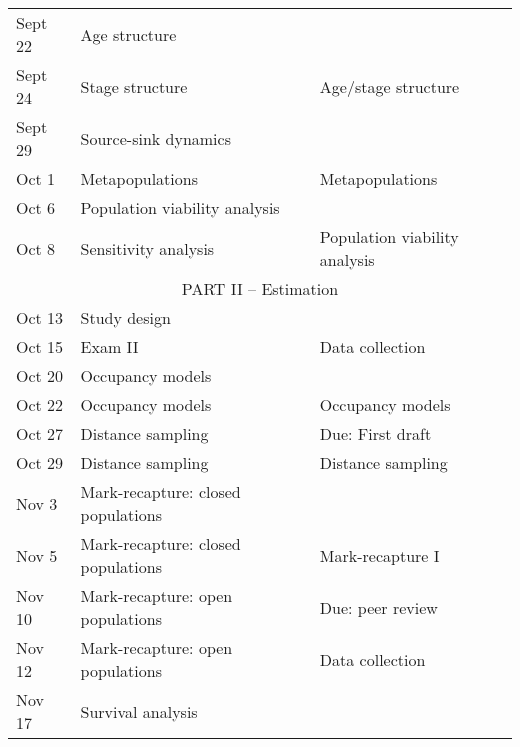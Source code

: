 \documentclass[12pt]{article}
\begin{document}
\begin{center}
\begin{tabular}[c]{lll}
\hline
Sept 22    & Age structure                      &                                      \\
Sept 24    & Stage structure                    & Age/stage structure                  \\
\hline
Sept 29      & Source-sink dynamics               &                                      \\
Oct 1      & Metapopulations                    & Metapopulations                      \\
\hline
Oct 6     & Population viability analysis      &                                      \\
Oct 8     & Sensitivity analysis               & Population viability analysis        \\
\hline
           \multicolumn{3}{c}{PART II -- Estimation}                                   \\
\hline
Oct 13     & Study design                       &                                      \\
Oct 15     & Exam II                            & Data collection                      \\
\hline
Oct 20     & Occupancy models                   &                                      \\
Oct 22     & Occupancy models                   & Occupancy models                     \\
\hline
Oct 27     & Distance sampling                  & Due: First draft                     \\
Oct 29     & Distance sampling                  & Distance sampling                    \\
\hline
Nov 3      & Mark-recapture: closed populations &                                      \\
Nov 5      & Mark-recapture: closed populations & Mark-recapture I                     \\
\hline
Nov 10     & Mark-recapture: open populations   & Due: peer review                     \\
Nov 12     & Mark-recapture: open populations   & Data collection                      \\
\hline
Nov 17     & Survival analysis                  &                                      \\

\end{tabular}
\end{center}
\end{document}
